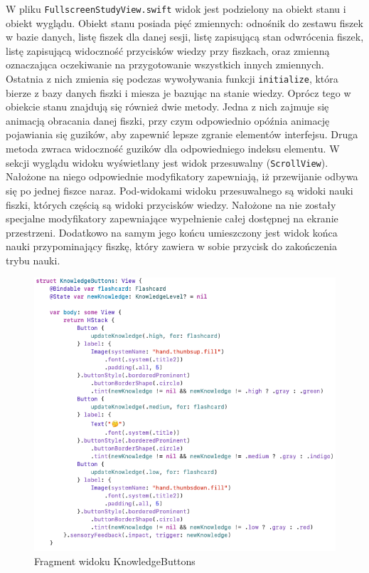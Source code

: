 \documentclass[final,a4paper,openany,12pt]{mwbk}
\begin{document}
W pliku \texttt{FullscreenStudyView.swift} widok jest podzielony na obiekt stanu i obiekt wyglądu. Obiekt stanu posiada pięć zmiennych: odnośnik do zestawu fiszek w bazie danych, listę fiszek dla danej sesji, listę zapisującą stan odwrócenia fiszek, listę zapisującą widoczność przycisków wiedzy przy fiszkach, oraz zmienną oznaczająca oczekiwanie na przygotowanie wszystkich innych zmiennych. Ostatnia z nich zmienia się podczas wywoływania funkcji \texttt{initialize}, która bierze z bazy danych fiszki i miesza je bazując na stanie wiedzy. Oprócz tego w obiekcie stanu znajdują się również dwie metody. Jedna z nich zajmuje się animacją obracania danej fiszki, przy czym odpowiednio opóźnia animację pojawiania się guzików, aby zapewnić lepsze zgranie elementów interfejsu. Druga metoda zwraca widoczność guzików dla odpowiedniego indeksu elementu. W sekcji wyglądu widoku wyświetlany jest widok przesuwalny (\texttt{ScrollView}). Nałożone na niego odpowiednie modyfikatory zapewniają, iż przewijanie odbywa się po jednej fiszce naraz. Pod-widokami widoku przesuwalnego  są widoki nauki fiszki, których częścią są widoki przycisków wiedzy. Nałożone na nie zostały specjalne modyfikatory zapewniające wypełnienie całej dostępnej na ekranie przestrzeni. Dodatkowo na samym jego końcu umieszczony jest widok końca nauki przypominający fiszkę, który zawiera w sobie przycisk do zakończenia trybu nauki.


\begin{figure}[H]
    \centering
    \includegraphics[width=0.7\linewidth]{img/knowledgebuttons1.png}
    \caption{Fragment widoku KnowledgeButtons}
    \label{fig:knowledgebuttons1}
\end{figure}
\end{document}

